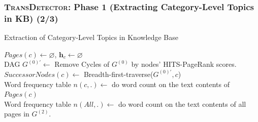 \documentclass{beamer}
\begin{document}
\begin{frame}
\frametitle{\textsc{TransDetector}: Phase 1 (Extracting Category-Level Topics in KB) (2/3)}
\begin{algorithm}[H]
\scriptsize
\caption{Extraction of Category-Level Topics in Knowledge Base}
\label{alg:normalStatesInit}

\(Pages(c)\leftarrow \varnothing\), \(\bm{h}_c \leftarrow \varnothing\)\\
DAG \(G^{(0)'} \leftarrow\) Remove Cycles of \(G^{(0)}\) by nodes' HITS-PageRank scores. \label{alg:line2inNormalStatesInit}\\
\(SuccessorNodes(c) \leftarrow \) Breadth-first-traverse(\(G^{(0)'},c\))\label{alg:line3inNormalStatesInit}\\
Word frequency table \(n(c,.) \leftarrow \) do word count on the text contents of \(Pages(c)\) \\
Word frequency table \(n(All,.) \leftarrow \) do word count on the text contents of all pages in \(G^{(2)}\).\\
\end{algorithm}
	
\end{frame}
\end{document}
